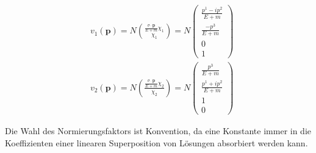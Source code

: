 \documentclass[10pt, letterpaper]{article}
\begin{document}
$$
\begin{aligned}
& v_{1}(\mathbf{p})=N\binom{\frac{\sigma \cdot \mathbf{p}}{E+m} \chi_{1}}{\chi_{1}}=N\left(\begin{array}{c}
\frac{p^{1}-i p^{2}}{E+m} \\
\frac{-p^{3}}{E+m} \\
0 \\
1
\end{array}\right) \\
& v_{2}(\mathbf{p})=N\left(\frac{\frac{\sigma \cdot \mathbf{p}}{E+m} \chi_{2}}{\chi_{2}}\right)=N\left(\begin{array}{c}
\frac{p^{3}}{E+m} \\
\frac{p^{1}+i p^{2}}{E+m} \\
1 \\
0
\end{array}\right)
\end{aligned}
$$

Die Wahl des Normierungsfaktors ist Konvention, da eine Konstante immer in die Koeffizienten einer linearen Superposition von Lösungen absorbiert werden kann. 
\end{document}
